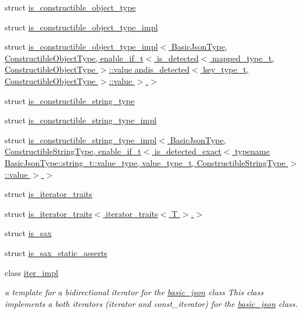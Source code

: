 \begin{DoxyCompactItemize}
\item 
struct \hyperlink{structnlohmann_1_1detail_1_1is__constructible__object__type}{is\+\_\+constructible\+\_\+object\+\_\+type}
\item 
struct \hyperlink{structnlohmann_1_1detail_1_1is__constructible__object__type__impl}{is\+\_\+constructible\+\_\+object\+\_\+type\+\_\+impl}
\item 
struct \hyperlink{structnlohmann_1_1detail_1_1is__constructible__object__type__impl_3_01_basic_json_type_00_01_con54f4e42d1833d70d2e8917d37429aa30}{is\+\_\+constructible\+\_\+object\+\_\+type\+\_\+impl$<$ Basic\+Json\+Type, Constructible\+Object\+Type, enable\+\_\+if\+\_\+t$<$ is\+\_\+detected$<$ mapped\+\_\+type\+\_\+t, Constructible\+Object\+Type $>$\+::value andis\+\_\+detected$<$ key\+\_\+type\+\_\+t, Constructible\+Object\+Type $>$\+::value $>$ $>$}
\item 
struct \hyperlink{structnlohmann_1_1detail_1_1is__constructible__string__type}{is\+\_\+constructible\+\_\+string\+\_\+type}
\item 
struct \hyperlink{structnlohmann_1_1detail_1_1is__constructible__string__type__impl}{is\+\_\+constructible\+\_\+string\+\_\+type\+\_\+impl}
\item 
struct \hyperlink{structnlohmann_1_1detail_1_1is__constructible__string__type__impl_3_01_basic_json_type_00_01_con83e8ebfe9593f851a60fdb8360df1512}{is\+\_\+constructible\+\_\+string\+\_\+type\+\_\+impl$<$ Basic\+Json\+Type, Constructible\+String\+Type, enable\+\_\+if\+\_\+t$<$ is\+\_\+detected\+\_\+exact$<$ typename Basic\+Json\+Type\+::string\+\_\+t\+::value\+\_\+type, value\+\_\+type\+\_\+t, Constructible\+String\+Type $>$\+::value $>$ $>$}
\item 
struct \hyperlink{structnlohmann_1_1detail_1_1is__iterator__traits}{is\+\_\+iterator\+\_\+traits}
\item 
struct \hyperlink{structnlohmann_1_1detail_1_1is__iterator__traits_3_01iterator__traits_3_01_t_01_4_01_4}{is\+\_\+iterator\+\_\+traits$<$ iterator\+\_\+traits$<$ T $>$ $>$}
\item 
struct \hyperlink{structnlohmann_1_1detail_1_1is__sax}{is\+\_\+sax}
\item 
struct \hyperlink{structnlohmann_1_1detail_1_1is__sax__static__asserts}{is\+\_\+sax\+\_\+static\+\_\+asserts}
\item 
class \hyperlink{classnlohmann_1_1detail_1_1iter__impl}{iter\+\_\+impl}
\begin{DoxyCompactList}\small\item\em a template for a bidirectional iterator for the \hyperlink{classnlohmann_1_1basic__json}{basic\+\_\+json} class This class implements a both iterators (iterator and const\+\_\+iterator) for the \hyperlink{classnlohmann_1_1basic__json}{basic\+\_\+json} class. \end{DoxyCompactList}\item 

\end{DoxyCompactItemize}
